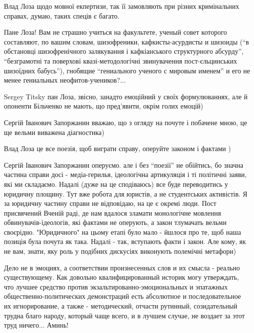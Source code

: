 \begin{itemize}
\begin{itemize}

Влад Лоза щодо мовної екпертизи, так її замовляють при різних кримінальних
справах, думаю, таких спеців є багато.

\end{itemize}


Пане Лоза! Вам не страшно учиться на факультете, ученый совет которого
составляют, по вашим словам, шизофреники, кафкисты-асурдисты и шизоиды
(\enquote{в обстановці шизофренічного залякування і кафкіанського структурного
абсурду}, \enquote{безграмотні та поверхові квазі-методологічні звинувачення
пост-єльцинських шизоїдних бабусь}), гнобящие \enquote{гениального ученого с
мировым именем} и его не менее гениальных неофитов-учеников?...

\begin{itemize}
Sergey Titsky пан Лоза, звісно, занадто емоційний у своїх формулюваннях, але й
опоненти Більченко не мають, що пред'явити, окрім голих емоцій)


Сергій Іванович Запоржанин вважаю, що з огляду на почуте і побачене мною, це ще вельми виважена діагностика)


Влад Лоза це все поезія, щоб виграти справу, оперуйте законом і фактами )


Сергій Іванович Запоржанин оперуємо. але і без \enquote{поезії} не обійтись, бо значна
частина справи досі - медіа-герилья, ідеологічна артикуляція і ті політичні
заяви, які ми складаємо. Надалі (дуже на це сподіваюсь) все буде переводитись у
юридичну площину. Тут вже робота для юристів, а не студентських активістів. Я
за юридичну частину справи не відповідаю, на це є окремі люди. Пост присвячений
Вченій раді, де нам вдалося зламати монологічне мовлення обвинувачів-ідеологів,
які фактами не оперують, а закон тлумачать вельми своєрідно. "Юридичного" на
цьому етапі було мало - йшлося про те, щоб наша позиція була почута як така.
Надалі - так, вступають факти і закон. Але кому, як не вам, знати, яку роль у
подібних дискусіях виконують полемічні метафори)


Дело не в эмоциях, а соответствии произнесенных слов и их смысла - реально
существующему. Как довольно квалифицированный историк могу утверждать, что
лучшее средство против экзальтированно-эмоциональных и эпатажных
общественно-политических демонстраций есть абсолютное и последовательное их
игнорирование, а также - методический, отчасти рутинный, созидательный трудна
благо народу, который чаще всего, и в лучшем случае, не воздает за этот труд
ничего... Аминь!


\end{itemize}
\end{itemize}
